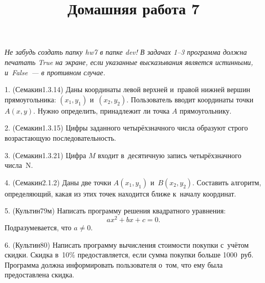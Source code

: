 \documentclass[12pt,russian,draft]{article}
\title{Домашняя работа 7}
\date{}
\begin{document}
\maketitle{}

\emph{Не забудь создать папку hw7 в папке dev! В задачах 1--3 программа должна
    печатать True на экране, если указанные высказывания является истинными,
    и~False~--- в противном случае.}

1. (Семакин1.3.14) Даны координаты левой верхней и~правой нижней вершин
пря\-мо\-уголь\-ника: $(x_1, y_1)$ и~$(x_2, y_2)$. Пользователь вводит координаты
точки $A(x, y)$. Нужно определить, принадлежит ли точка $A$ прямоугольнику.

2. (Семакин1.3.15) Цифры заданного четырёхзначного числа образуют строго
воз\-раста\-ющую последовательность.

3. (Семакин1.3.21) Цифра $M$ входит в~десятичную запись четырёхзначного
числа~N.

4. (Семакин2.1.2) Даны две точки $A(x_1, y_1)$ и~$B(x_2, y_2)$. Составить
алгоритм, опре\-деля\-ю\-щий, какая из этих точек находится ближе к~началу
координат.

5. (Культин79м) Написать программу решения квадратного уравнения:
\[
    ax^2 + bx + c = 0.
\]
Подразумевается, что $a \neq 0$.

6. (Культин80) Написать программу вычисления стоимости покупки с~учётом скидки.
Скидка в~10\% предоставляется, если сумма покупки больше 1000~руб. Программа
должна информировать пользователя о~том, что ему была предоставлена скидка.
\end{document}
